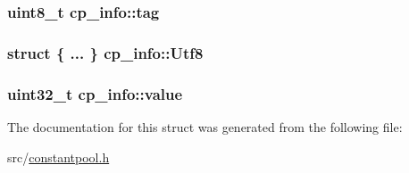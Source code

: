 \subsubsection[{\texorpdfstring{tag}{tag}}]{\setlength{\rightskip}{0pt plus 5cm}uint8\+\_\+t cp\+\_\+info\+::tag}\hypertarget{structcp__info_a29d87595bc993eb6cd53f30e8305ec74}{}\label{structcp__info_a29d87595bc993eb6cd53f30e8305ec74}
\subsubsection[{\texorpdfstring{Utf8}{Utf8}}]{\setlength{\rightskip}{0pt plus 5cm}struct \{ ... \}   cp\+\_\+info\+::\+Utf8}\hypertarget{structcp__info_a25ee4592009bd74535de00796abf40eb}{}\label{structcp__info_a25ee4592009bd74535de00796abf40eb}
\subsubsection[{\texorpdfstring{value}{value}}]{\setlength{\rightskip}{0pt plus 5cm}uint32\+\_\+t cp\+\_\+info\+::value}\hypertarget{structcp__info_abdf544fc1b14cb7bfcb5ecabb74a0e84}{}\label{structcp__info_abdf544fc1b14cb7bfcb5ecabb74a0e84}


The documentation for this struct was generated from the following file\+:\begin{DoxyCompactItemize}
\item 
src/\hyperlink{constantpool_8h}{constantpool.\+h}\end{DoxyCompactItemize}
